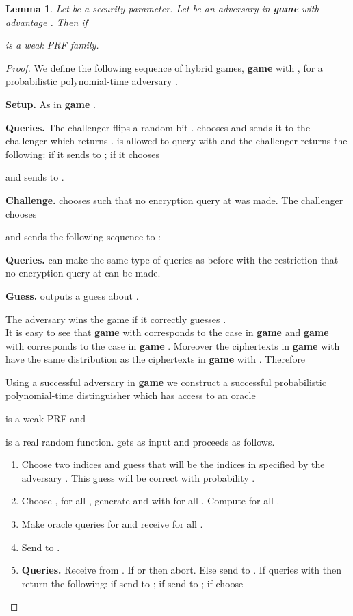 \documentclass[10pt]{extarticle}
\newtheorem{Lem}[Thm]{Lemma}
\begin{document}
\begin{Lem}\label{gamethreeprf} Let  be a security parameter. Let  be an adversary in \textbf{\upshape game } with advantage . Then  if 
 
is a weak PRF family.
\end{Lem}
\begin{proof} We define the following sequence of hybrid games, \textbf{game}  with , for a probabilistic polynomial-time adversary .
\noindent\begin{description}
 \item\textbf{Setup.} As in \textbf{game} .
\item\textbf{Queries.} The challenger flips a random bit .  chooses  and sends it to the challenger which returns .  is allowed to query  with  and the challenger returns the following: if  it sends  to ; if  it chooses 

and sends  to .
\item\textbf{Challenge.}  chooses  such that no encryption query at  was made. The challenger chooses 

and sends the following sequence to : 

\item\textbf{Queries.}  can make the same type of queries as before with the restriction that no encryption query at  can be made.
\item\textbf{Guess.}  outputs a guess about .
\end{description}
The adversary wins the game if it correctly guesses .\\

\noindent It is easy to see that \textbf{game}  with  corresponds to the case  in \textbf{game}  and \textbf{game}  with  corresponds to the case  in \textbf{game} . Moreover the ciphertexts in \textbf{game}  with  have the same distribution as the ciphertexts in \textbf{game}  with . Therefore

Using a successful adversary  in \textbf{\upshape game } we construct a successful probabilistic polynomial-time distinguisher  which has access to an oracle 
 
 
is a weak PRF and 
 
is a real random function.  gets  as input and proceeds as follows.
\noindent\begin{enumerate}
\item Choose two indices  and guess that  will be the  indices in  specified by the adversary . This guess will be correct with probability .
\item Choose , for all , generate  and  with  for all . Compute  for all .
\item Make oracle queries for  and receive  for all .
\item Send  to .
\item\textbf{Queries.} Receive  from . If  or  then abort. Else send  to .
 If  queries  with  then return the following: if  send  to ; if  send  to ; if  choose 


\end{enumerate}
\end{proof}
\end{document}
